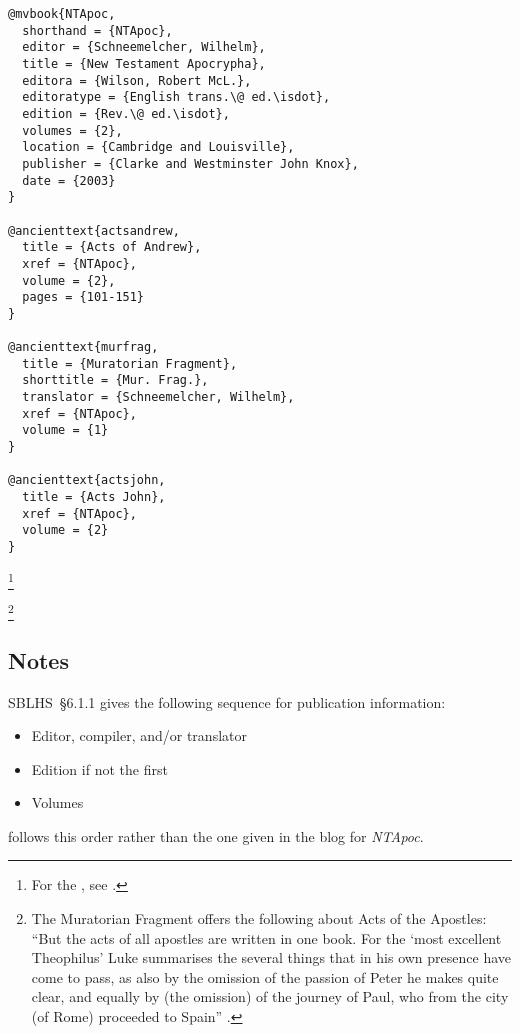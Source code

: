\documentclass[a4paper]{article}
\begin{document}
\begin{verbatim}
@mvbook{NTApoc,
  shorthand = {NTApoc},
  editor = {Schneemelcher, Wilhelm},
  title = {New Testament Apocrypha},
  editora = {Wilson, Robert McL.},
  editoratype = {English trans.\@ ed.\isdot},
  edition = {Rev.\@ ed.\isdot},
  volumes = {2},
  location = {Cambridge and Louisville},
  publisher = {Clarke and Westminster John Knox},
  date = {2003}
}

@ancienttext{actsandrew,
  title = {Acts of Andrew},
  xref = {NTApoc},
  volume = {2},
  pages = {101-151}
}

@ancienttext{murfrag,
  title = {Muratorian Fragment},
  shorttitle = {Mur. Frag.},
  translator = {Schneemelcher, Wilhelm},
  xref = {NTApoc},
  volume = {1}
}

@ancienttext{actsjohn,
  title = {Acts John},
  xref = {NTApoc},
  volume = {2}
}
\end{verbatim}

\begin{fverbcite}{13}
  \footnote{For the , see .}
\end{fverbcite}
\begin{fverbcite}{22}
  \footnote{The Muratorian Fragment offers the following about Acts of the
    Apostles: “But the acts of all apostles are written in one book. For the
    ‘most excellent Theophilus’ Luke summarises the several things that in his
    own presence have come to pass, as also by the omission of the passion of
    Peter he makes quite clear, and equally by (the omission) of the journey
    of Paul, who from the city (of Rome) proceeded to Spain”
    .}
\end{fverbcite}
\begin{fverbcite}{22}
  \autocite[For Lycomedes’s lament over his wife Cleopatra’s paralysis,
  see][(20)173]{actsjohn}
\end{fverbcite}
\exampleancientsources
\examplesecondarysources

\subsection{Notes}

SBLHS~§6.1.1 gives the following sequence for publication information:
\begin{itemize}
  \item Editor, compiler, and/or translator
  \item Edition if not the first
  \item Volumes
\end{itemize}
 follows this order rather than the one given in the blog
for \emph{NTApoc}.
\end{document}
